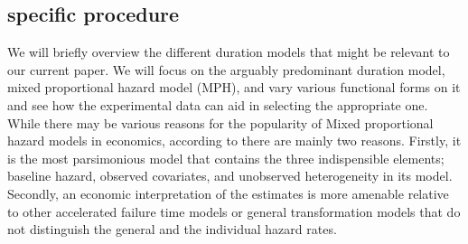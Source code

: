 \documentclass{article}
\begin{document}
\subsection{specific procedure}
We will briefly overview the different duration models that might be relevant to our current paper.  We will focus on the arguably predominant duration model, mixed proportional hazard model (MPH), and vary various functional forms on it and see how the experimental data can aid in selecting the appropriate one.\\
While there may be various reasons for the popularity of Mixed proportional hazard models in economics, according to \cite{heckman1984method, van2001duration, abbring2003nonparametric} there are mainly two reasons.
Firstly,  it is the most parsimonious model that contains the three indispensible elements; baseline hazard, observed covariates, and unobserved heterogeneity in its model. Secondly, an economic interpretation of the estimates is more amenable relative to other accelerated failure time models or general transformation models that do not distinguish the general and the individual hazard rates.
\end{document}
